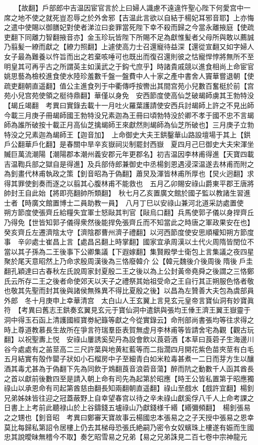 　　【故翻】戶部郎中吉温因宦官言於上曰婦人識慮不遠違忤聖心陛下何愛宫中一席之地不使之就死豈忍辱之於外舍邪【吉温此言欲以自結于楊妃耳邪音耶】上亦悔之遣中使賜以御膳妃對使者涕泣曰妾罪當死陛下幸不殺而歸之今當永離掖庭【使疏吏翻下同離力智翻掖音亦】金玉珍玩皆陛下所賜不足為獻惟髪者父母所與敢以薦誠乃翦髪一繚而獻之【繚力照翻】上遽使高力士召還寵待益深【還從宣翻又如字婦人女子最為難養以忤旨而出之若棄咳唾可也既出而復召還則彼之怙寵悍悖將無所不至明皇其可再乎古之所謂英主如漢武之于鈎弋庶乎】時諸貴戚競以進食相尚上命宦官姚思藝為檢校進食使水陸珍羞數千盤一盤費中人十家之產中書舍人竇華嘗退朝【使疏吏翻朝直遥翻】值公主進食列于中衢傳呼按轡出其間宫苑小兒數百奮梃於前【宫苑小兒宫苑使領之梃待鼎翻】華僅以身免　安西節度使高仙芝破朅師虜其王勃特没【朅丘竭翻　考異曰實錄去載十一月吐火羅葉護請使安西兵討朅師上許之不見出師今載三月庚子冊朅師國王勃特没兄素迦為王冊曰頃勃特没於卿不孝于國不忠不言朅師為誰所破按十載正月高仙芝擒朅師王來獻然則朅師為仙芝所破也】三月庚子立勃特没之兄素迦為朅師王【迦音加】　上命御史大夫王鉷鑿華山路設壇場于其上【鉷戶公翻華戶化翻】是春關中旱辛亥嶽祠災制罷封西嶽　夏四月己巳御史大夫宋渾坐贓巨萬流潮陽【潮陽郡本潮州義安郡元年更郡名】初吉温因李林甫得進【天寶四載吉温鞫兵部之獄自是得進】及兵部侍郎兼御史中丞楊釗恩遇浸深温遂去林甫而附之為釗畫代林甫執政之策【釗音昭為于偽翻】蕭炅及渾皆林甫所厚也【炅火迥翻】求得其罪使釗奏而逐之以翦其心腹林甫不能救也　五月乙卯賜安祿山爵東平郡王唐將帥封王自此始【將即亮翻帥所類翻】　秋七月乙亥置廣文館於國子監以教諸生習進士者【時廣文館置博士二員助教一員】　八月丁巳以安祿山兼河北道采訪處置使　朔方節度使張齊丘給糧失宜軍士怒敺其判官【敺烏口翻】兵馬使郭子儀以身捍齊丘乃得免【世皆知郭子儀得衆然後能捍免張齊丘而不知當此之時唐之軍政果安在也】癸亥齊丘左遷濟陰太守【濟陰郡曹州濟子禮翻】以河西節度使安思順權知朔方節度事　辛卯處士崔昌上言【處昌呂翻上時掌翻】國家宜承周漢以土代火周隋皆閏位不當以其子孫為二王後事下公卿集議【下遐嫁翻】集賢殿學士衛包上言集議之夜四星聚於尾天意昭然上乃命求殷周漢後為三恪廢韓介公【韓元魏後介後周後隋後戶圭翻孔穎達曰古春秋左氏說周家封夏殷二王之後以為上公封黃帝堯舜之後謂之三恪鄭氏云所存二王之後者命使郊天以天子之禮祭其始祖受命之王自行其正朔服色恪者敬也敬其先聖而封其後與諸侯無殊異不得比夏殷之後】以昌為左贊善大夫包為虞部員外郎　冬十月庚申上幸華清宫　太白山人王玄翼上言見玄元皇帝言寶仙洞有妙寶眞符　【考異曰舊志王鉷奏玄翼見玄元于寶仙洞中遣鉷與張均王倕王濟王翼王嶽靈于洞中得玉石函上清護國經寶劵紀籙等獻之今從實錄云】命刑部尚書張均等往求得之時上尊道教慕長生故所在爭言符瑞羣臣表賀無虚月李林甫等皆請舍宅為觀【觀古玩翻】以祝聖夀上悦　安祿山屢誘奚契丹為設會飲以莨菪酒【本草曰莨菪子生海邊川谷今處處有之苖莖高二三尺許葉與地黄紅藍等而二指濶四月開花紫色苗夾莖有白毛五月結實有殻作罌子狀如小石榴房中子至細青白如米粒毒甚煮一二日而芽方生以釀酒其毒尤甚為于偽翻下先為同飲于鴆翻莨音浪菪音蕩】醉而阬之動數千人函其酋長之首以獻前後數四至是請入朝上命有司先為起第於昭應【時王公皆私置第于昭應獨祿山以承恩命有司起第酋慈由翻長知兩翻朝直遥翻】祿山至戲水【戲許宜翻】楊釗兄弟姊妹皆往迎之冠蓋蔽野上自幸望春宫以待之辛未祿山獻奚俘八千人上命考課之日書上上考前此聽禄山於上谷鑄錢五壚祿山乃獻錢様千緡【緡彌頻翻】　楊釗張易之之甥也【釗音昭　考異曰鄭審天寶故事云楊國忠本張易之之子天授中張易之恩幸莫比每歸私第詔令居樓上仍去其梯母恐張氏絶嗣乃密令女奴蠙珠上樓遂有娠而生國忠其說曖昧無稽今不取】奏乞昭雪易之兄弟【易之兄弟誅見二百七卷中宗神龍元